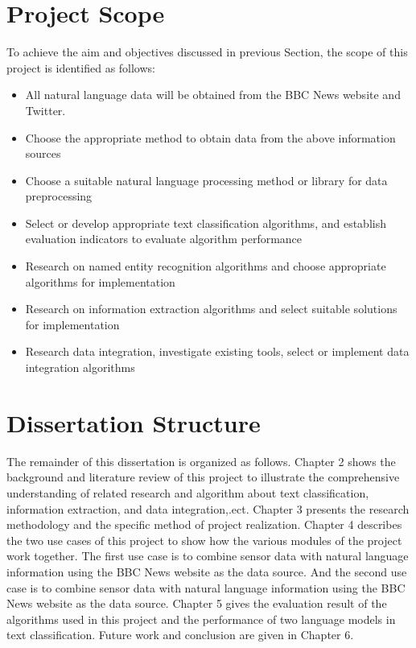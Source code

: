 \section{Project Scope}
\qquad To achieve the aim and objectives discussed in previous Section, the scope of this project is identified as follows: 
\begin{itemize}
\item All natural language data will be obtained from the BBC News website and Twitter.
\item Choose the appropriate method to obtain data from the above information sources
\item Choose a suitable natural language processing method or library for data preprocessing
\item Select or develop appropriate text classification algorithms, and establish evaluation indicators to evaluate algorithm performance
\item Research on named entity recognition algorithms and choose appropriate algorithms for implementation
\item Research on information extraction algorithms and select suitable solutions for implementation
\item Research data integration, investigate existing tools, select or implement data integration algorithms
\end{itemize}
\section{Dissertation Structure}
\qquad The remainder of this dissertation is organized as follows. Chapter 2 shows the background and literature review of this project to illustrate the comprehensive understanding of related research and algorithm about text classification, information extraction, and data integration,.ect. Chapter 3 presents the research methodology and the specific method of project realization. Chapter 4 describes the two use cases of this project to show how the various modules of the project work together. The first use case is to combine sensor data with natural language information using the BBC News website as the data source. And the second use case is to combine sensor data with natural language information using the BBC News website as the data source. Chapter 5 gives the evaluation result of the algorithms used in this project and the performance of two language models in text classification. Future work and conclusion are given in Chapter 6.


